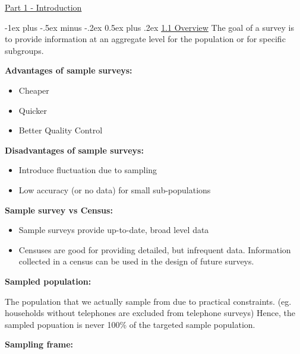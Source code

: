 \documentclass[10pt,landscape]{article}
\makeatletter
\renewcommand{\section}{\@startsection{section}{1}{0mm}%
                                  {-1ex plus -.5ex minus -.2ex}%
                                  {0.5ex plus .2ex}%
                                  {\normalfont\large\bfseries}}
\makeatother
\begin{document}
\raggedright
\footnotesize
\begin{multicols}{3}


\setlength{\premulticols}{1pt}
\setlength{\postmulticols}{1pt}
\setlength{\multicolsep}{1pt}
\setlength{\columnsep}{2pt}

\begin{center}
     \Large{\underline{Part 1 - Introduction}} \\
\end{center}

\section{\underline{1.1 Overview}}
The goal of a survey is to provide information at an aggregate level for the population or for specific subgroups.

\textbf{Advantages of sample surveys:}
\begin{itemize}
  \item Cheaper
  \item Quicker
  \item Better Quality Control
\end{itemize}

\textbf{Disadvantages of sample surveys:}
\begin{itemize}
  \item Introduce fluctuation due to sampling
  \item Low accuracy (or no data) for small sub-populations
\end{itemize}

\textbf{Sample survey vs Census:}
\begin{itemize}
  \item Sample surveys provide up-to-date, broad level data
  \item Censuses are good for providing detailed, but infrequent data. Information collected in a census can be used in the design of future surveys.
\end{itemize}

\textbf{Sampled population:}

The population that we actually sample from due to practical constraints. (eg. households without telephones are excluded from telephone surveys) Hence, the sampled popuation is never 100\% of the targeted sample population.

\textbf{Sampling frame:}


\end{multicols}
\end{document}
